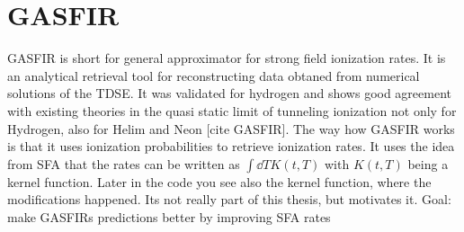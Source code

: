 \section{GASFIR}
GASFIR is short for general approximator for strong field ionization rates.
It is an analytical retrieval tool for reconstructing data obtaned from numerical solutions of the TDSE. 
It was validated for hydrogen and shows good agreement with existing theories in the quasi static limit of tunneling ionization not only for Hydrogen, also for Helim and Neon [cite GASFIR].
The way how GASFIR works is that it uses ionization probabilities to retrieve ionization rates. 
It uses the idea from SFA that the rates can be written as $\int \dd T K(t,T)$ with $K(t,T)$ being a kernel function.
Later in the code you see also the kernel function, where the modifications happened. 
Its not really part of this thesis, but motivates it.
Goal: make GASFIRs predictions better by improving SFA rates




